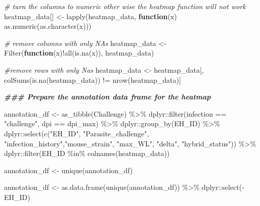 \documentclass[
]{article}
\newenvironment{Shaded}{\begin{snugshade}}{\end{snugshade}}
\newcommand{\CommentTok}[1]{\textcolor[rgb]{0.56,0.35,0.01}{\textit{#1}}}
\newcommand{\ControlFlowTok}[1]{\textcolor[rgb]{0.13,0.29,0.53}{\textbf{#1}}}
\newcommand{\DocumentationTok}[1]{\textcolor[rgb]{0.56,0.35,0.01}{\textbf{\textit{#1}}}}
\newcommand{\FunctionTok}[1]{\textcolor[rgb]{0.00,0.00,0.00}{#1}}
\newcommand{\NormalTok}[1]{#1}
\newcommand{\OtherTok}[1]{\textcolor[rgb]{0.56,0.35,0.01}{#1}}
\newcommand{\SpecialCharTok}[1]{\textcolor[rgb]{0.00,0.00,0.00}{#1}}
\newcommand{\StringTok}[1]{\textcolor[rgb]{0.31,0.60,0.02}{#1}}
\begin{document}
\begin{Shaded}
\begin{Highlighting}[]
 \CommentTok{\# turn the columns to numeric other wise the heatmap function will not work}
\NormalTok{ heatmap\_data[] }\OtherTok{\textless{}{-}} \FunctionTok{lapply}\NormalTok{(heatmap\_data, }\ControlFlowTok{function}\NormalTok{(x) }\FunctionTok{as.numeric}\NormalTok{(}\FunctionTok{as.character}\NormalTok{(x)))}

 \CommentTok{\# remove columns with only NAs }
\NormalTok{ heatmap\_data }\OtherTok{\textless{}{-}} \FunctionTok{Filter}\NormalTok{(}\ControlFlowTok{function}\NormalTok{(x)}\SpecialCharTok{!}\FunctionTok{all}\NormalTok{(}\FunctionTok{is.na}\NormalTok{(x)), heatmap\_data) }
 
 \CommentTok{\#remove rows with only Nas}
\NormalTok{ heatmap\_data }\OtherTok{\textless{}{-}}\NormalTok{  heatmap\_data[, }\FunctionTok{colSums}\NormalTok{(}\FunctionTok{is.na}\NormalTok{(heatmap\_data)) }\SpecialCharTok{!=} \FunctionTok{nrow}\NormalTok{(heatmap\_data)]}


 \DocumentationTok{\#\#\# Prepare the annotation data frame for the heatmap}

 
\NormalTok{annotation\_df }\OtherTok{\textless{}{-}} \FunctionTok{as\_tibble}\NormalTok{(Challenge) }\SpecialCharTok{\%\textgreater{}\%}
\NormalTok{  dplyr}\SpecialCharTok{::}\FunctionTok{filter}\NormalTok{(infection }\SpecialCharTok{==} \StringTok{"challenge"}\NormalTok{, dpi }\SpecialCharTok{==}\NormalTok{ dpi\_max) }\SpecialCharTok{\%\textgreater{}\%}
\NormalTok{  dplyr}\SpecialCharTok{::}\FunctionTok{group\_by}\NormalTok{(EH\_ID) }\SpecialCharTok{\%\textgreater{}\%}
\NormalTok{  dplyr}\SpecialCharTok{::}\FunctionTok{select}\NormalTok{(}\FunctionTok{c}\NormalTok{(}\StringTok{"EH\_ID"}\NormalTok{, }\StringTok{"Parasite\_challenge"}\NormalTok{, }\StringTok{"infection\_history"}\NormalTok{,}\StringTok{"mouse\_strain"}\NormalTok{, }
                  \StringTok{"max\_WL"}\NormalTok{, }\StringTok{"delta"}\NormalTok{, }\StringTok{"hybrid\_status"}\NormalTok{)) }\SpecialCharTok{\%\textgreater{}\%}
\NormalTok{  dplyr}\SpecialCharTok{::}\FunctionTok{filter}\NormalTok{(EH\_ID }\SpecialCharTok{\%in\%} \FunctionTok{colnames}\NormalTok{(heatmap\_data))}
  
\NormalTok{annotation\_df }\OtherTok{\textless{}{-}} \FunctionTok{unique}\NormalTok{(annotation\_df)}
 

\NormalTok{annotation\_df }\OtherTok{\textless{}{-}} \FunctionTok{as.data.frame}\NormalTok{(}\FunctionTok{unique}\NormalTok{(annotation\_df)) }\SpecialCharTok{\%\textgreater{}\%}
\NormalTok{  dplyr}\SpecialCharTok{::}\FunctionTok{select}\NormalTok{(}\SpecialCharTok{{-}}\NormalTok{EH\_ID)}


\end{Highlighting}
\end{Shaded}
\end{document}
